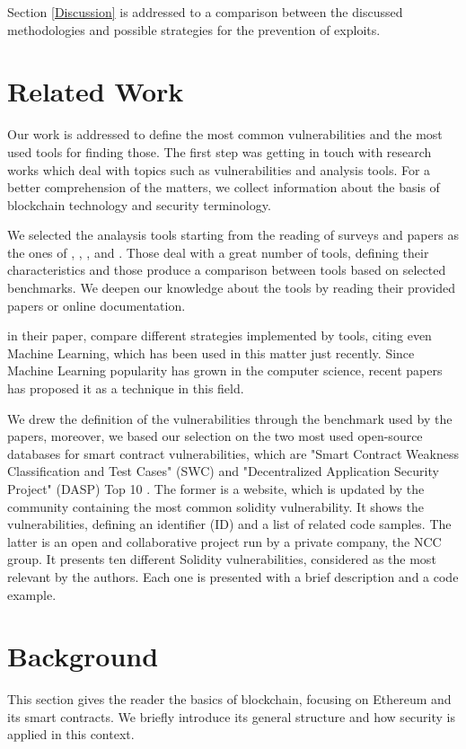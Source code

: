 \documentclass[a4paper,sigconf, language=french,
language=german, language=spanish, language=english]{acmart}
\begin{document}
Section \ref{Discussion} is addressed to a comparison between the discussed methodologies and 
possible strategies for the prevention of exploits.



\section{Related Work}
\label{RelatedWork}
Our work is addressed to define the most common vulnerabilities and the most used tools for finding those.
The first step was getting in touch with research works which deal with topics such as vulnerabilities and analysis tools. For a better comprehension of the matters, we collect information about the basis of blockchain technology and security terminology. 

We selected the analaysis tools starting from the reading of surveys and papers as the ones of \citet{SurvTools}, \citet{Thesis}, \citet{AutomaticTools}, \citet{AttacksAndProtection} and \cite{ToolsAndVuln}. 
Those deal with a great number of tools, defining their characteristics and those produce a comparison between tools based on selected benchmarks. We deepen our knowledge about the tools by reading their provided papers or online documentation.

\citet{Methodologies} in their paper, compare different strategies implemented by tools, citing even Machine Learning, which has been used in this matter just recently.
Since Machine Learning popularity has grown in the computer science, recent papers has proposed it as a technique in this field. 

We drew the definition of the vulnerabilities through the benchmark used by the papers, moreover, we based our selection on the two most used open-source databases for smart contract vulnerabilities, which are "Smart Contract Weakness Classification and Test Cases" (SWC) \cite{SWC} and "Decentralized Application Security Project" (DASP) Top 10  \cite{DASP10}. The former is a website, which is updated by the community containing the most common solidity vulnerability. It shows the vulnerabilities, defining an identifier (ID) and a list of related code samples. The latter is an open and collaborative project run by a private company, the NCC group. It presents ten different Solidity vulnerabilities, considered as the most relevant by the authors. Each one is presented with a brief description and a code example.

\section{Background}
\label{Background}
This section gives the reader the basics of blockchain, 
focusing on Ethereum and its smart contracts. We briefly introduce its general 
structure and how security is applied in this context.
\end{document}
